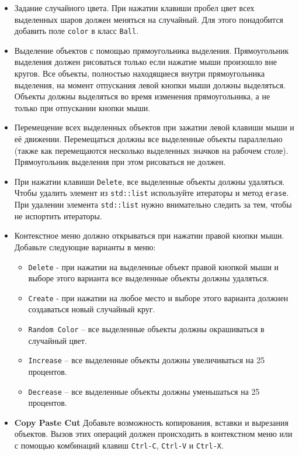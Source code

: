 \documentclass{article}
\begin{document}
\begin{itemize}
\item Задание случайного цвета. При нажатии клавиши пробел цвет всех выделенных шаров должен меняться на случайный. Для этого понадобится добавить поле \texttt{color} в класс \texttt{Ball}.

\item Выделение объектов с помощью прямоугольника выделения. Прямоугольник выделения должен рисоваться только если нажатие мыши произошло вне кругов. Все объекты, полностью находящиеся внутри прямоугольника выделения, на момент отпускания левой кнопки мыши должны выделяться. Объекты должны выделяться во время изменения прямоугольника, а не только при отпускании кнопки мыши.

\item Перемещение всех выделенных объектов при зажатии левой клавиши мыши и её движении. Перемещаться должны все выделенные объекты параллельно (также как перемещаются несколько выделенных значков на рабочем столе). Прямоугольник выделения при этом рисоваться не должен.

\item При нажатии клавиши \texttt{Delete}, все выделенные объекты должны удаляться. Чтобы удалить элемент из \texttt{std::list} используйте итераторы и метод \texttt{erase}. При удалении элемента \texttt{std::list} нужно внимательно следить за тем, чтобы не испортить итераторы.

\item Контекстное меню должно открываться при нажатии правой кнопки мыши. Добавьте следующие варианты в меню:
\begin{itemize}
\item \texttt{Delete} - при нажатии на выделенные объект правой кнопкой мыши и выборе этого варианта все выделенные объекты должны удаляться.
\item \texttt{Create} - при нажатии на любое место и выборе этого варианта должнен создаваться новый случайный круг.
\item \texttt{Random Color} -- все выделенные объекты должны окрашиваться в случайный цвет.
\item \texttt{Increase} -- все выделенные объекты должны увеличиваться на 25 процентов.
\item \texttt{Decrease} -- все выделенные объекты должны уменьшаться на 25 процентов.
\end{itemize}

\item \textbf{Copy Paste Cut} Добавьте возможность копирования, вставки и вырезания объектов. Вызов этих операций должен происходить в контекстном меню или с помощью комбинаций клавиш \texttt{Ctrl-C}, \texttt{Ctrl-V} и \texttt{Ctrl-X}.
\end{itemize}
\end{document}
